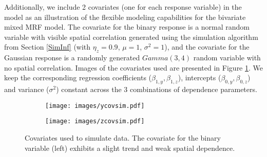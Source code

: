 \documentclass[12pt, a4paper, twoside]{article}
\begin{document}
Additionally, we include 2 covariates (one for each response variable) in the model as an illustration of the flexible modeling capabilities for the bivariate mixed MRF model. The covariate for the binary response is a normal random variable with visible spatial correlation  generated using the simulation algorithm from Section \ref{SimInf} (with $\eta_z=0.9$, $\mu=1$, $\sigma^2=1$), and the covariate for the Gaussian response is a randomly generated $Gamma(3,4)$ random variable with no spatial correlation. Images of the covariates used are presented in Figure \ref{covariateIMG}. We keep the corresponding regression coefficients ($\beta_{1,y}, \beta_{1,z}$), intercepts ($\beta_{0,y}, \beta_{0,z}$) and variance ($\sigma^2$) constant across the 3 combinations of dependence parameters.
\begin{figure}[t] 
\centering
	\begin{subfigure}{0.4\textwidth}
		\centering
	\texttt{[image: images/ycovsim.pdf]}
	\end{subfigure}
	\begin{subfigure}{0.4\textwidth}
		\centering
	\texttt{[image: images/zcovsim.pdf]}
	\end{subfigure}
\caption[Covariates Used in Estimation Procedure Study]{Covariates used to simulate data. The covariate for the binary variable (left) exhibits a slight trend and weak spatial dependence.}
\label{covariateIMG}
\end{figure}
\end{document}
